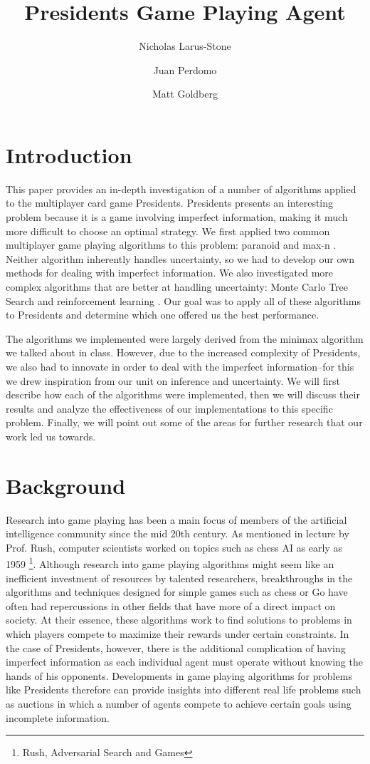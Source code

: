 \documentclass[11pt]{article}
\title{Presidents Game Playing Agent}
\author{Nicholas Larus-Stone \and Juan Perdomo \and Matt Goldberg}
\begin{document}
\maketitle{}

\section{Introduction}

This paper provides an in-depth investigation of a number of algorithms applied to the multiplayer card game Presidents. Presidents presents an interesting problem because it is a game involving imperfect information, making it much more difficult to choose an optimal strategy. We first applied two common multiplayer game playing algorithms to this problem: paranoid and max-n \cite{sturtevant03a}. Neither algorithm inherently handles uncertainty, so we had to develop our own methods for dealing with imperfect information. We also investigated more complex algorithms that are better at handling uncertainty: Monte Carlo Tree Search \cite{browne12} and reinforcement learning \cite{fujita03}. Our goal was to apply all of these algorithms to Presidents and determine which one offered us the best performance.

The algorithms we implemented were largely derived from the minimax algorithm we talked about in class. However, due to the increased complexity of Presidents, we also had to innovate in order to deal with the imperfect information--for this we drew inspiration from our unit on inference and uncertainty. We will first describe how each of the algorithms were implemented, then we will discuss their results and analyze the effectiveness of our implementations to this specific problem. Finally, we will point out some of the areas for further research that our work led us towards.

\section{Background}

Research into game playing has been a main focus of members of the artificial intelligence community since the mid 20th century. As mentioned in lecture by Prof. Rush, computer scientists worked on topics such as chess AI as early as 1959 \footnote{Rush, Adversarial Search and Games}. Although research into game playing algorithms might seem like an inefficient investment of resources by talented researchers, breakthroughs in the algorithms and techniques designed for  simple games such as chess or Go have often had repercussions in other fields that have more of a direct impact on society. At their essence, these algorithms work to find solutions to problems in which players compete to maximize their rewards under certain constraints. In the case of Presidents, however, there is the additional complication of having imperfect information as each individual agent must operate without knowing the hands of his opponents. Developments in game playing algorithms for problems like Presidents therefore can provide insights into different real life problems such as auctions in which a number of agents compete to achieve certain goals using incomplete information.\\
\end{document}
